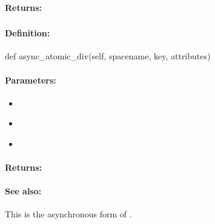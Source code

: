 \paragraph{Returns:}


\pagebreak
\subsubsection{}
\label{api:python:async_atomic_div}


\paragraph{Definition:}
\begin{pythoncode}
def async_atomic_div(self, spacename, key, attributes)
\end{pythoncode}

\paragraph{Parameters:}
\begin{itemize}[noitemsep]
\item {}\\

\item {}\\

\item {}\\

\end{itemize}

\paragraph{Returns:}


\paragraph{See also:}  This is the asynchronous form of .

\pagebreak
\subsubsection{}
\label{api:python:microtransaction_atomic_div}


